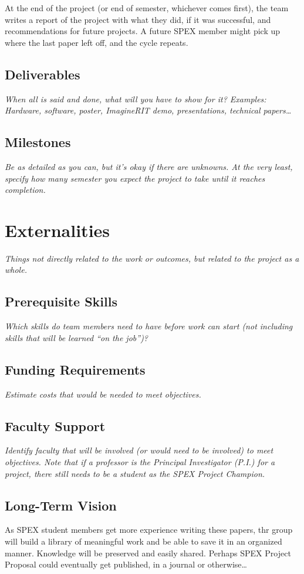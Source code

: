 \documentclass[journal]{SPEXformat}
\newcommand*{\HELP}{}%
\begin{document}
At the end of the project (or end of semester, whichever comes first), the team writes a report of the project with what they did, if it was successful, and recommendations for future projects.
A future SPEX member might pick up where the last paper left off, and the cycle repeats.

\subsection{Deliverables}
\label{subsec:deliverables}
\ifdefined\HELP\em
  When all is said and done, what will you have to show for it?
  Examples: Hardware, software, poster, ImagineRIT demo, presentations, technical papers\ldots
\em\fi

\subsection{Milestones}
\label{subsec:milestones}
\ifdefined\HELP\em
  Be as detailed as you can, but it's okay if there are unknowns.
  At the very least, specify how many semester you expect the project to take until it reaches completion.
\em\fi

\section{Externalities}
\ifdefined\HELP\em
  Things not directly related to the work or outcomes, but related to the project as a whole.
\em\fi

\subsection{Prerequisite Skills}
\ifdefined\HELP\em
  Which skills do team members need to have before work can start (not including skills that will be learned ``on the job'')?
\em\fi

\subsection{Funding Requirements}
\ifdefined\HELP\em
  Estimate costs that would be needed to meet objectives.
\em\fi

\subsection{Faculty Support}
\ifdefined\HELP\em
  Identify faculty that will be involved (or would need to be involved) to meet objectives.
  Note that if a professor is the Principal Investigator (P.I.) for a project, there still needs to be a student as the SPEX Project Champion.
\em\fi

\subsection{Long-Term Vision}
\label{sec:vision}
As SPEX student members get more experience writing these papers, thr group will build a library of meaningful work and be able to save it in an organized manner.
Knowledge will be preserved and easily shared.
Perhaps SPEX Project Proposal could eventually get published, in a journal or otherwise\ldots
\end{document}

